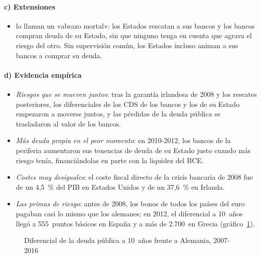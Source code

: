 \documentclass[11pt]{article}
\begin{document}
\paragraph{c) Extensiones}

\begin{itemize}
\item \textcite{FarhiTirole2018} lo llaman un «abrazo mortal»: los Estados rescatan a sus bancos y los bancos compran deuda de su Estado, sin que ninguno tenga en cuenta que agrava el riesgo del otro. Sin supervisión común, los Estados incluso animan a sus bancos a comprar su deuda.
\end{itemize}

\paragraph{d) Evidencia empírica}

\begin{itemize}
\item \emph{Riesgos que se mueven juntos}: tras la garantía irlandesa de 2008 y los rescates posteriores, los diferenciales de los CDS de los bancos y los de su Estado empezaron a moverse juntos, y las pérdidas de la deuda pública se trasladaron al valor de los bancos\nocite{AcharyaDrechslerSchnabl2014}.
\item \emph{Más deuda propia en el peor momento}: en 2010-2012, los bancos de la periferia aumentaron sus tenencias de deuda de su Estado justo cuando más riesgo tenía, financiándolas en parte con la liquidez del BCE\nocite{AcharyaSteffen2015}.
\item \emph{Costes muy desiguales}: el coste fiscal directo de la crisis bancaria de 2008 fue de un 4,5~\% del PIB en Estados Unidos y de un 37,6~\% en Irlanda\nocite{LaevenValencia2020}.
\item \emph{Las primas de riesgo}: antes de 2008, los bonos de todos los países del euro pagaban casi lo mismo que los alemanes; en 2012, el diferencial a 10~años llegó a 555~puntos básicos en España y a más de 2.700~en Grecia\nocite{BCE2026IRS} (gráfico~\ref{fig:diferenciales-soberanos}).
\end{itemize}

\begin{figure}[H]
\centering
\caption{Diferencial de la deuda pública a 10~años frente a Alemania, 2007-2016}\label{fig:diferenciales-soberanos}
\end{figure}
\end{document}
